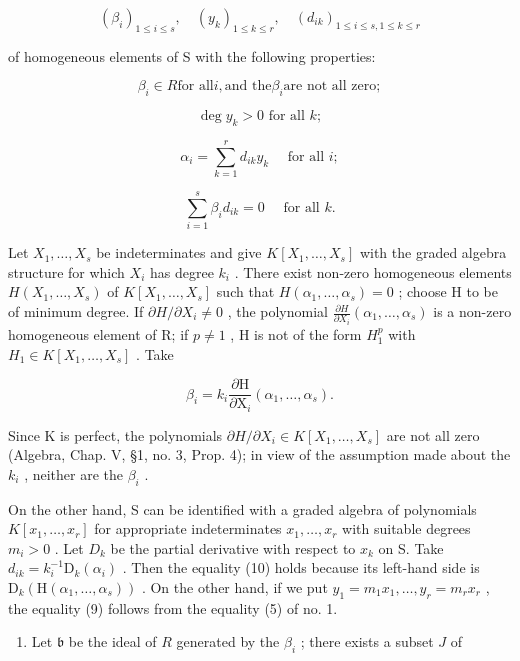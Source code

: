 \[
\left(\beta_ {i}\right) _ {1 \leqslant i \leqslant s}, \quad \left(y _ {k}\right) _ {1 \leqslant k \leqslant r}, \quad \left(d _ {i k}\right) _ {1 \leqslant i \leqslant s, 1 \leqslant k \leqslant r}
\]

of homogeneous elements of S with the following properties:

\[
\beta_ {i} \in R \text {for all} i, \text {and the} \beta_ {i} \text {are not all zero};\tag{7}
\]

\[
\deg y _ {k} > 0 \text {   for   all   } k;\tag{8}
\]

\[
\alpha_ {i} = \sum_ {k = 1} ^ {r} d _ {i k} y _ {k} \quad \text { for   all } i;\tag{9}
\]

\[
\sum_ {i = 1} ^ {s} \beta_ {i} d _ {i k} = 0 \quad \text { for   all } k.\tag{10}
\]

Let \(X_{1},\ldots,X_{s}\) be indeterminates and give \(K[X_{1},\ldots,X_{s}]\) with the graded algebra structure for which \(X_{i}\) has degree \(k_{i}\) . There exist non-zero homogeneous elements \(H(X_{1},\ldots,X_{s})\) of \(K[X_{1},\ldots,X_{s}]\) such that \(H(\alpha_{1},\ldots,\alpha_{s})=0\) ; choose H to be of minimum degree. If \(\partial H/\partial X_{i}\neq0\) , the polynomial \(\frac{\partial H}{\partial X_{i}}(\alpha_{1},\ldots,\alpha_{s})\) is a non-zero homogeneous element of R; if \(p\neq1\) , H is not of the form \(H_{1}^{p}\) with \(H_{1}\in K[X_{1},\ldots,X_{s}]\) . Take

\[
\beta_ {i} = k _ {i} \frac {\partial \mathrm{H}}{\partial \mathrm{X} _ {i}} (\alpha_ {1}, \dots , \alpha_ {s}).
\]

Since K is perfect, the polynomials \(\partial H/\partial X_{i} \in K[X_{1},\ldots,X_{s}]\) are not all zero (Algebra, Chap. V, §1, no. 3, Prop. 4); in view of the assumption made about the \(k_{i}\) , neither are the \(\beta_{i}\) .

On the other hand, S can be identified with a graded algebra of polynomials \(K[x_{1},\ldots,x_{r}]\) for appropriate indeterminates \(x_{1},\ldots,x_{r}\) with suitable degrees \(m_{i}>0\) . Let \(D_{k}\) be the partial derivative with respect to \(x_{k}\) on S. Take \(d_{ik} = k_i^{-1}\mathrm{D}_k(\alpha_i)\) . Then the equality (10) holds because its left-hand side is \(\mathrm{D}_k(\mathrm{H}(\alpha_1,\dots ,\alpha_s))\) . On the other hand, if we put \(y_{1} = m_{1}x_{1},\ldots ,y_{r} = m_{r}x_{r}\) , the equality (9) follows from the equality (5) of no. 1.

\begin{enumerate}
\def\labelenumi{\arabic{enumi})}
\setcounter{enumi}{1}
\tightlist
\item
  Let \(\mathfrak{b}\) be the ideal of \(R\) generated by the \(\beta_{i}\) ; there exists a subset \(J\) of
\end{enumerate}

